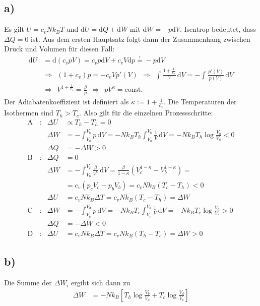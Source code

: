 \documentclass[a4paper,12pt]{article}
\newcommand{\intx}{}
\newcommand{\kla}{}
\newcommand{\klam}{}
\newcommand{\tecxt}{}
\begin{document}
\subsection*{a)}Es gilt $U=c_vNk_BT$ und d$U=\tecxt\text{d}Q+\tecxt\text{d}W$ mit d$W=-p\tecxt\text{d}V$. Isentrop bedeutet, dass $\Delta Q=0$ ist. Aus dem ersten Hauptsatz folgt dann der Zusammenhang zwischen Druck und Volumen für diesen Fall:
\begin{align*}
\tecxt\text{d}U&=\tecxt\text{d}(c_vpV)=c_vp\tecxt\text{d}V+c_vV\tecxt\text{d}p\overset{!}{=}-p\tecxt\text{d}V\\
&\Rightarrow\ \ (1+c_v)p=-c_vVp'(V)\ \ \Rightarrow\ \ \intx\int_{ }^{ }\frac{1+\frac{1}{c_v}}{V}\,\mathrm{d}V=-\intx\int_{ }^{ }\frac{p'(V)}{p(V)}\,\mathrm{d}V\\
&\Rightarrow\ \ V^{1+\frac{1}{c_v}}=\frac{\beta}{p}\ \ \Rightarrow\ \ pV^\kappa=\tecxt\text{const.}
\end{align*}
Der Adiabatenkoeffizient ist definiert als $\kappa:=1+\frac{1}{c_v}$. Die Temperaturen der Isothermen sind $T_h>T_c$. Also gilt für die einzelnen Prozessschritte:
\begin{align*}
\tecxt\text{A}&\,:&\Delta U&\propto T_h-T_h=0\\
&&\Delta W&=-\intx\int_{V_a}^{V_b}p\,\mathrm{d}V=-Nk_BT_h\intx\int_{V_a}^{V_b}\frac{1}{V}\,\mathrm{d}V=-Nk_BT_h\log\frac{V_b}{V_a}<0\\
&&\Delta Q&=-\Delta W>0\\
\tecxt\text{B}&\,:&\Delta Q&=0\\
&&\Delta W&=-\intx\int_{V_b}^{V_c}\frac{\beta}{V^{\kappa}}\,\mathrm{d}V=\frac{\beta}{1-\kappa}\kla\left( {V_c^{1-\kappa}-V_b^{1-\kappa}} \right)=\\
&&&=c_v(p_cV_c-p_bV_b)=c_vNk_B(T_c-T_h)<0\\
&&\Delta U&=c_vNk_B\Delta T=c_vNk_B(T_c-T_h)=\Delta W\\
\tecxt\text{C}&\,:&\Delta W&=-\intx\int_{V_c}^{V_d}p\,\mathrm{d}V=-Nk_BT_c\intx\int_{V_c}^{V_d}\frac{1}{V}\,\mathrm{d}V=-Nk_BT_c\log\frac{V_d}{V_c}>0\\
&&\Delta Q&=-\Delta W<0\\
\tecxt\text{D}&\,:&\Delta U&=c_vNk_B\Delta T=c_vNk_B(T_h-T_c)=\Delta W>0
\end{align*}
\subsection*{b)}Die Summe der $\Delta W_i$ ergibt sich dann zu
\begin{align*}
\Delta W&=-Nk_B\klam\left[ {T_h\log\frac{V_b}{V_a}+T_c\log\frac{V_d}{V_c}} \right]
\end{align*}
\end{document}
